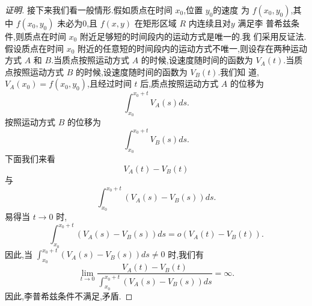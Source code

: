 \documentclass[a4paper, 12pt]{article} %
\begin{document}
\begin{CJK}{UTF8}{gkai}
\begin{proof}[证明]
接下来我们看一般情形.假如质点在时间 $x_0$,位置 $y_0$的速度
为 $f(x_0,y_0)$,其中 $f(x_0,y_0)$ 未必为0,且 $f(x,y)$ 在矩形区域 $R$ 内连续且对$y$ 满足李
普希兹条件,则质点在时间 $x_0$ 附近足够短的时间段内的运动方式是唯一的.我
们采用反证法.假设质点在时间 $x_0$ 附近的任意短的时间段内的运动方式不唯一,则设存在两种运动方式 $A$ 和
$B$.当质点按照运动方式 $A$ 的时候,设速度随时间的函数为 $V_A(t)$.当质点按照运动方式 $B$ 的时候,设速度随时间的函数为 $V_B(t)$.我们知
道,$V_A(x_0)=f(x_0,y_0)$,且经过时间 $t$ 后,质点按照运动方式 $A$ 的位移为
$$
\int_{x_0}^{x_0+t}V_A(s)ds.
$$
按照运动方式 $B$ 的位移为
$$
\int_{x_0}^{x_0+t}V_B(s)ds.
$$
下面我们来看
$$
V_A(t)-V_B(t)
$$
与
$$
\int_{x_0}^{x_0+t}(V_A(s)-V_B(s))ds.
$$
易得当 $t\to 0$ 时,
$$
\int_{x_0}^{x_0+t}(V_A(s)-V_B(s))ds=o(V_A(t)-V_B(t)).
$$
因此,当 $\int_{x_0}^{x_0+t}(V_A(s)-V_B(s))ds\neq 0$ 时,我们有
$$
\lim_{t\to 0}\frac{V_A(t)-V_B(t)}{\int_{x_0}^{x_0+t}(V_A(s)-V_B(s))ds}=\infty.
$$
因此,李普希兹条件不满足,矛盾.
\end{proof}
  

  

  
\end{CJK}
\end{document}
